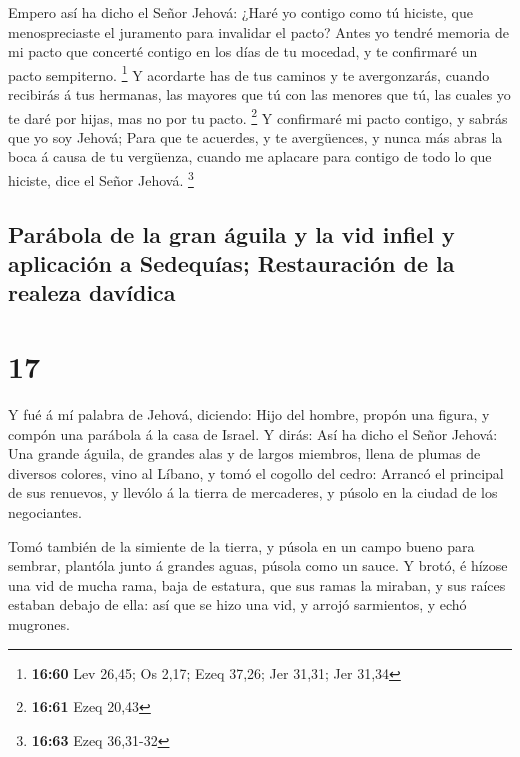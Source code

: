  Empero así ha dicho el Señor Jehová: ¿Haré yo contigo como
tú hiciste, que menospreciaste el juramento para invalidar el pacto?
 Antes yo tendré memoria de mi pacto que concerté contigo
en los días de tu mocedad, y te confirmaré un pacto sempiterno.
\footnote{\textbf{16:60} Lev 26,45; Os 2,17; Ezeq 37,26; Jer 31,31; Jer
  31,34}  Y acordarte has de tus caminos y te avergonzarás,
cuando recibirás á tus hermanas, las mayores que tú con las menores que
tú, las cuales yo te daré por hijas, mas no por tu pacto. \footnote{\textbf{16:61}
  Ezeq 20,43}  Y confirmaré mi pacto contigo, y sabrás que
yo soy Jehová;  Para que te acuerdes, y te avergüences, y
nunca más abras la boca á causa de tu vergüenza, cuando me aplacare para
contigo de todo lo que hiciste, dice el Señor Jehová. \footnote{\textbf{16:63}
  Ezeq 36,31-32}

\hypertarget{paruxe1bola-de-la-gran-uxe1guila-y-la-vid-infiel-y-aplicaciuxf3n-a-sedequuxedas-restauraciuxf3n-de-la-realeza-davuxeddica}{%
\subsection{Parábola de la gran águila y la vid infiel y aplicación a
Sedequías; Restauración de la realeza
davídica}\label{paruxe1bola-de-la-gran-uxe1guila-y-la-vid-infiel-y-aplicaciuxf3n-a-sedequuxedas-restauraciuxf3n-de-la-realeza-davuxeddica}}

\hypertarget{section-16}{%
\section{17}\label{section-16}}

 Y fué á mí palabra de Jehová, diciendo:  Hijo
del hombre, propón una figura, y compón una parábola á la casa de
Israel.  Y dirás: Así ha dicho el Señor Jehová: Una grande
águila, de grandes alas y de largos miembros, llena de plumas de
diversos colores, vino al Líbano, y tomó el cogollo del cedro:
 Arrancó el principal de sus renuevos, y llevólo á la tierra
de mercaderes, y púsolo en la ciudad de los negociantes.

 Tomó también de la simiente de la tierra, y púsola en un
campo bueno para sembrar, plantóla junto á grandes aguas, púsola como un
sauce.  Y brotó, é hízose una vid de mucha rama, baja de
estatura, que sus ramas la miraban, y sus raíces estaban debajo de ella:
así que se hizo una vid, y arrojó sarmientos, y echó mugrones.

